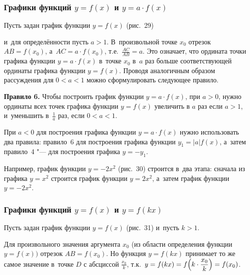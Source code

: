 \subsubsection{Графики функций $y = f(x)$ и $y = a \cdot f(x)$}

Пусть задан график функции $y  = f(x)$ (рис.~29)

\begin{figure}
\end{figure}

и~для определённости пусть $a > 1$.
В~произвольной точке $x_{0}$ отрезок $AB = f(x_{0})$,
а~$AC = a \cdot f(x_{0})$, т.е.~$\displaystyle \frac{AC}{AB} = a$.
Это означает, что ордината точки графика функции $y = a \cdot f(x)$
в~точке $x_{0}$ в~$a$ раз больше соответствующей ординаты графика
функции $y = f(x)$.
Проводя аналогичным образом рассуждения для $0 < a < 1$ можно
сформулировать следующее правило.

\textbf{Правило 6.} Чтобы построить график функции $y = a \cdot f(x)$,
при $a > 0$, нужно ординаты всех точек графика функции $y = f(x)$
увеличить в $a$ раз если $a > 1$, и~уменьшить в~$\displaystyle \frac{1}{a}$ раз,
если $0 < a < 1$.

При $a < 0$ для построения графика функции $y = a \cdot f(x)$ нужно
использовать два правила: правило~6 для построения графика функции $y_{1} = |a| f(x)$,
а~затем правило~4 "--- для построения графика $y = -y_{1}$.

Например, график функции $y = -2x^{2}$ (рис.\ 30) строится в~два этапа:
сначала из графика $y = x^{2}$ строится график функции $y = 2x^{2}$,
а~затем график функции $y = -2x^{2}$.

\begin{figure}
\end{figure}


\subsubsection{Графики функций $y = f(x)$ и $y = f(kx)$}

Пусть задан график функции $y = f(x)$ (рис.\ 31) и~пусть $k>1$.

Для произвольного значения аргумента $x_{0}$ (из области определения
функции $y = f(x))$ отрезок $AB = f(x_{0})$.
Но функция $y = f(kx)$ принимает то же самое значение в~точке $D$
с абсциссой $\displaystyle \frac{x_{0}}{k}$,
т.к.\ $\displaystyle y = f(kx) = f \Bigl( k \cdot \frac{x_{0}}{k} \Bigr) = f(x_{0})$.

